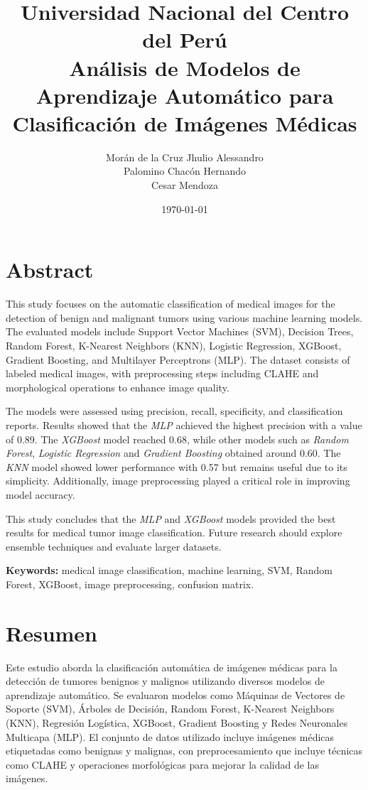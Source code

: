 \documentclass[12pt]{article}
\title{Universidad Nacional del Centro del Perú \\ \vspace{1em} Análisis de Modelos de Aprendizaje Automático para Clasificación de Imágenes Médicas}
\author{Morán de la Cruz Jhulio Alessandro \\ Palomino Chacón Hernando \\ Cesar Mendoza}
\date{\today}
\begin{document}
\maketitle

\section*{Abstract}
This study focuses on the automatic classification of medical images for the detection of benign and malignant tumors using various machine learning models. The evaluated models include Support Vector Machines (SVM), Decision Trees, Random Forest, K-Nearest Neighbors (KNN), Logistic Regression, XGBoost, Gradient Boosting, and Multilayer Perceptrons (MLP). The dataset consists of labeled medical images, with preprocessing steps including CLAHE and morphological operations to enhance image quality.

The models were assessed using precision, recall, specificity, and classification reports. Results showed that the \textit{MLP} achieved the highest precision with a value of 0.89. The \textit{XGBoost} model reached 0.68, while other models such as \textit{Random Forest}, \textit{Logistic Regression} and \textit{Gradient Boosting} obtained around 0.60. The \textit{KNN} model showed lower performance with 0.57 but remains useful due to its simplicity. Additionally, image preprocessing played a critical role in improving model accuracy.

This study concludes that the \textit{MLP} and \textit{XGBoost} models provided the best results for medical tumor image classification. Future research should explore ensemble techniques and evaluate larger datasets.

\textbf{Keywords:} medical image classification, machine learning, SVM, Random Forest, XGBoost, image preprocessing, confusion matrix.

\newpage

\section*{Resumen}
Este estudio aborda la clasificación automática de imágenes médicas para la detección de tumores benignos y malignos utilizando diversos modelos de aprendizaje automático. Se evaluaron modelos como Máquinas de Vectores de Soporte (SVM), Árboles de Decisión, Random Forest, K-Nearest Neighbors (KNN), Regresión Logística, XGBoost, Gradient Boosting y Redes Neuronales Multicapa (MLP). El conjunto de datos utilizado incluye imágenes médicas etiquetadas como benignas y malignas, con preprocesamiento que incluye técnicas como CLAHE y operaciones morfológicas para mejorar la calidad de las imágenes.
\end{document}
